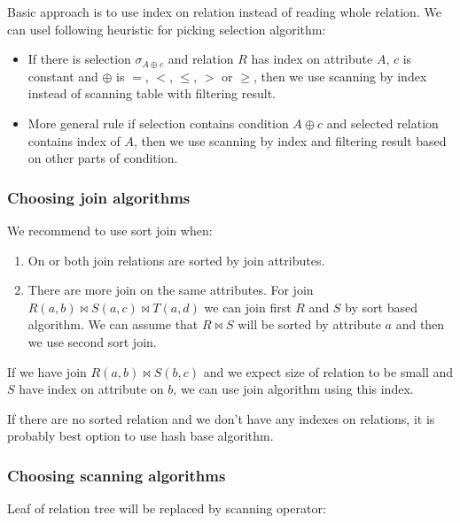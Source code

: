 Basic approach is to use index on relation instead of reading whole relation. We can usel following heuristic for picking selection algorithm: 
\begin{itemize}
\item If there is selection $\sigma_{A\oplus c}$ and relation $R$ has index on attribute $A$, $c$ is constant and $\oplus$ is $=$, $<$, $\leq$, $>$ or $\geq$, then we use scanning by index instead of scanning table with filtering result.
\item More general rule if selection contains condition $A\oplus c$ and selected relation contains index of $A$, then we use scanning by index and filtering result based on other parts of condition.
\end{itemize}

\subsubsection{Choosing join algorithms}

We recommend to use sort join when:

\begin{enumerate}
\item On or both join relations are sorted by join attributes.
\item There are more join on the same attributes. For join $R(a,b)\Join S(a,c) \Join T(a,d)$ we can join first $R$ and $S$ by sort based algorithm. We can assume that $R \Join S$ will be sorted by attribute $a$ and then we use second sort join.

\end{enumerate}

If we have join $R(a,b)\Join S(b,c)$ and we expect size of relation to be small and $S$ have index on attribute on $b$, we can use join algorithm using this index.

If there are no sorted relation and we don't have any indexes on relations, it is probably best option to use hash base algorithm.

\subsubsection{Choosing scanning algorithms}

Leaf of relation tree will be replaced by scanning operator:

